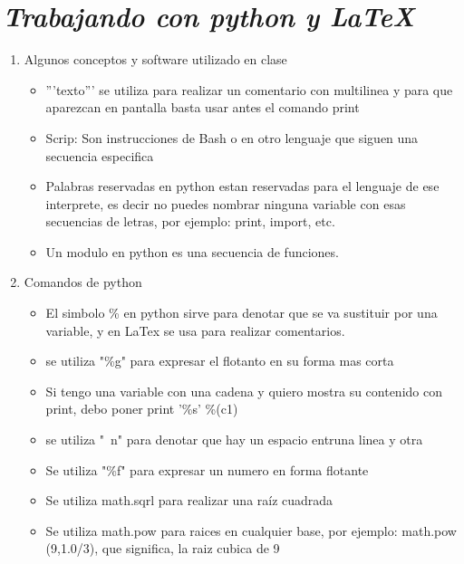 \documentclass{book}
\begin{document}

\section{\textit{Trabajando con python y \LaTeX}}%
\begin{flushright}
	\date{11 de enero de 2019}
\end{flushright}

\begin{enumerate}%
	\item Algunos conceptos y software utilizado en clase%
	\begin{itemize}
		\item '''texto''' se utiliza para realizar un comentario con multilinea y para que aparezcan en pantalla basta usar antes el comando print 			
		\item Scrip: Son instrucciones de Bash o en otro lenguaje que siguen una secuencia especifica			
		\item Palabras reservadas en python estan reservadas para el lenguaje de ese interprete, es decir no puedes nombrar ninguna variable con esas secuencias de letras, por ejemplo: print, import, etc.
		\item Un modulo en python es una secuencia de funciones.
	\end{itemize}
	
	\item Comandos de python%
	\begin{itemize}%
		\item El simbolo \% en python sirve para denotar que se va sustituir por una variable, y en LaTex se usa para realizar comentarios.
		\item se utiliza "\%g" para expresar el flotanto en su forma mas corta
		\item Si tengo una variable con una cadena y quiero mostra su contenido con print, debo poner print '\%s' \%(c1)
		\item se utiliza "\ n" para denotar que hay un espacio entruna linea y otra
		\item Se utiliza "\%f" para expresar un numero en forma flotante
		\item Se utiliza math.sqrl para realizar una raíz cuadrada
		\item Se utiliza math.pow para raices en cualquier base, por ejemplo: math.pow (9,1.0/3), que significa, la raiz cubica de 9
		

\end{itemize}
\end{enumerate}
\end{document}
